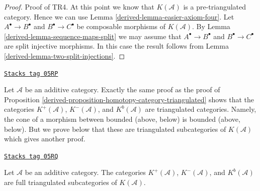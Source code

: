 \begin{proof}
\medskip\noindent
Proof of TR4. At this point we know that $K(\mathcal{A})$
is a pre-triangulated category. Hence we can use
Lemma \ref{derived-lemma-easier-axiom-four}. Let $A^\bullet \to B^\bullet$
and $B^\bullet \to C^\bullet$ be composable morphisms of
$K(\mathcal{A})$. By Lemma \ref{derived-lemma-sequence-maps-split} we may assume that
$A^\bullet \to B^\bullet$ and $B^\bullet \to C^\bullet$
are split injective morphisms. In this case the result follows
from Lemma \ref{derived-lemma-two-split-injections}.
\end{proof}

\begin{remark}
\label{derived-remark-boundedness-conditions-triangulated}
\href{https://stacks.math.columbia.edu/tag/05RP}{\texttt{Stacks tag 05RP}}

Let $\mathcal{A}$ be an additive category.
Exactly the same proof as the proof of
Proposition \ref{derived-proposition-homotopy-category-triangulated}
shows that the categories
$K^{+}(\mathcal{A})$, $K^{-}(\mathcal{A})$, and $K^b(\mathcal{A})$
are triangulated categories. Namely, the cone of a morphism between
bounded (above, below) is bounded (above, below).
But we prove below that these are triangulated subcategories
of $K(\mathcal{A})$ which gives another proof.
\end{remark}

\begin{lemma}
\label{derived-lemma-bounded-triangulated-subcategories}
\href{https://stacks.math.columbia.edu/tag/05RQ}{\texttt{Stacks tag 05RQ}}

Let $\mathcal{A}$ be an additive category. The categories
$K^{+}(\mathcal{A})$, $K^{-}(\mathcal{A})$, and $K^b(\mathcal{A})$
are full triangulated subcategories of $K(\mathcal{A})$.
\end{lemma}

